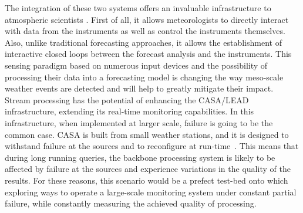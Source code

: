 The integration of these two systems offers an invaluable infrastructure to atmospheric scientists
\cite{casa-lead}.  First of all, it allows meteorologists to directly interact with data from the
instruments as well as control the instruments themselves. Also, unlike traditional forecasting
approaches, it allows the establishment of interactive closed loops between the forecast analysis and the
instruments. This sensing paradigm based on numerous input devices and the possibility of processing
their data into a forecasting model is changing the way meso-scale weather events are detected and will
help to greatly mitigate their impact. Stream processing has the potential of enhancing the CASA/LEAD
infrastructure, extending its real-time monitoring capabilities. In this infrastructure, when implemented
at larger scale, failure is going to be the common case. CASA is built from small weather stations, and
it is designed to withstand failure at the sources and to reconfigure at run-time~\cite{casa}. This means
that during long running queries, the backbone processing system is likely to be affected by failure at
the sources and experience variations in the quality of the results.  For these reasons, this scenario
would be a prefect test-bed onto which exploring ways to operate a large-scale monitoring system under
constant partial failure, while constantly measuring the achieved quality of processing.

